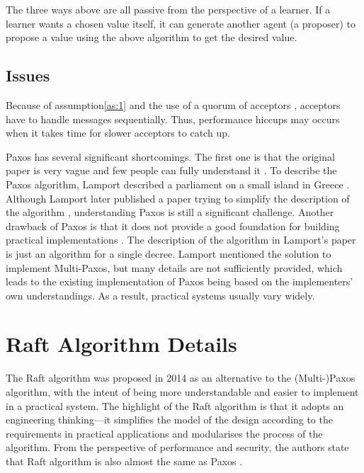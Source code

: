 \documentclass[12pt, a4paper]{article}
\begin{document}
The three ways above are all passive from the perspective of a learner.
If a learner wants a chosen value itself, it can generate another agent (a proposer) to propose a value using the above algorithm to get the desired value.

\subsection{Issues}
Because of assumption\ref{as:1} and the use of a quorum of acceptors
\cite{jalili2014practical}, acceptors have to handle messages sequentially.
Thus, performance hiccups may occurs when it takes time for slower acceptors to catch up.

Paxos has several significant shortcomings.
The first one is that the original paper is very vague
and few people can fully understand it \cite{conf/usenix/OngaroO14}.
To describe the Paxos algorithm, Lamport described a parliament on a small island
in Greece \cite{lamport1998part}.
Although Lamport later published a paper trying to simplify the description
of the algorithm \cite{lamport2001paxos}, understanding Paxos is still a significant challenge.
Another drawback of Paxos is that it does not provide a good foundation for
building practical implementations \cite{conf/usenix/OngaroO14}.
The description of the algorithm in Lamport's paper is
just an algorithm for a single decree. Lamport mentioned the solution to
implement Multi-Paxos, but many details are not sufficiently provided,
which leads to the existing implementation of Paxos being
based on the implementers' own understandings.
As a result, practical systems usually vary widely.


\section{Raft Algorithm Details} \label{sec:raft}

The Raft algorithm was proposed in 2014 \cite{conf/usenix/OngaroO14} as an alternative to the (Multi-)Paxos algorithm, with the intent of being more understandable and easier to implement in a practical system. The highlight of the Raft algorithm is that it adopts an engineering thinking---it simplifies the model of the design according to the requirements in practical applications and modularises the process of the algorithm. From the perspective of performance and security, the authors state that Raft algorithm is also almost the same as Paxos \cite{conf/usenix/OngaroO14}.
\end{document}
